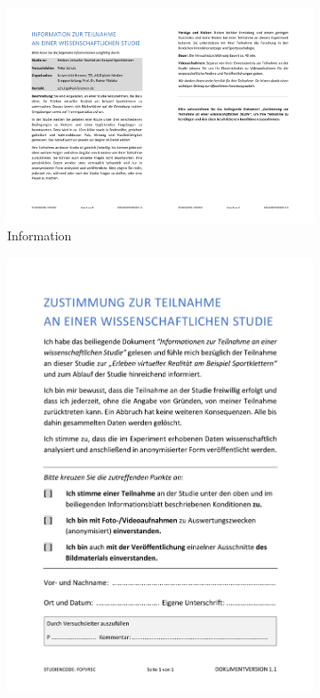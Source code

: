 \begin{landscape}
	\begin{figure}[ht]
		\centering
		\begin{subfigure}[b]{0.66\columnwidth}
			\centering
			\includegraphics[width=\textwidth]{include/images/study-legal-info}
			\caption{Information}
			\label{fig:study-legal-info}
		\end{subfigure}
		\hspace*{\fill}
		\begin{subfigure}[b]{0.33\columnwidth}
			\centering
			\includegraphics[width=\textwidth]{include/images/study-legal-consent}

\end{subfigure}
\end{figure}
\end{landscape}
